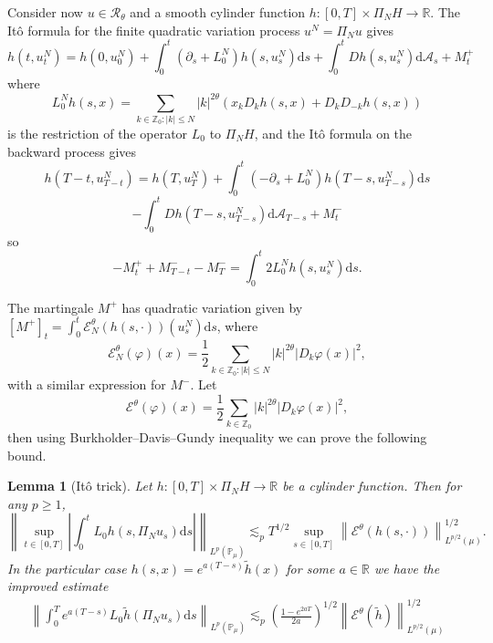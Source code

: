 \documentclass[11pt,a4paper,draft,reqno]{amsart}
\newtheorem{lemma}{Lemma}
\newcommand{\PP}{\mathbb{P}}
\newcommand{\RR}{\mathbb{R}}
\newcommand{\ZZ}{\mathbb{Z}}
\newcommand{\cE}{\mathcal{E}}
\newcommand{\dd}{\mathrm{d}}
\newcommand{\cA}{\mathcal{A}}
\newcommand{\cR}{\mathcal{R}}
\begin{document}
Consider now $u\in\cR_\theta$ and  a smooth cylinder function  $h:[0,T]\times \Pi_N H\to \RR$. The It\^o formula for the finite quadratic variation process $u^N = \Pi_N u$ gives
$$
h(t,u^N_t)=h(0,u^N_0)+\int_0^t (\partial_s + L^N_0) h(s,u^N_s) \dd s +\int_0^t D h(s,u^N_s) \dd \cA_s + M^+_t 
$$ 
where 
$$
L^N_0 h(s,x) = \sum_{k\in\ZZ_0 : |k|\le N} |k|^{2\theta} ( x_{k} D_k h(s,x) + D_k D_{-k} h(s,x))
$$
is the restriction of the operator $L_0$ to $\Pi_N H$,
and the It\^o formula on the backward process gives
$$
h(T-t,u^N_{T-t})=h(T,u^N_T)+ \int_0^{t} (-\partial_s + L^N_0) h(T-s,u^N_{T-s}) \dd s
$$
$$
- \int_0^{t} D h(T-s,u^N_{T-s}) \dd \cA_{T-s} + M^-_t 
$$ 
so
$$
 -M^+_t + M^-_{T-t}-M^-_T = \int_0^t 2 L_0^N   h(s,u^N_{s})\dd s. 
$$


The martingale $M^+$ has quadratic variation given by
$
[ M^+ ]_t = \int_0^t \cE^\theta_N(h(s,\cdot))(u^N_s) \dd s
$,
where 
$$
\cE_N^\theta(\varphi)(x) = \frac12  \sum_{k\in \ZZ_0: |k|\le N}|k|^{2\theta}  |D_k \varphi(x)|^2 ,
$$
with a similar expression for $M^-$. Let
$$
\cE^\theta(\varphi)(x) = \frac12  \sum_{k\in \ZZ_0}|k|^{2\theta}  |D_k \varphi(x)|^2 ,
$$
then using Burkholder--Davis--Gundy inequality we can prove the following bound.
\begin{lemma}[It\^o trick] 
\label{lemma:ito-trick}
Let $h : [0,T]\times \Pi_N H \to \RR$ be a cylinder function. Then
for any $p \geq 1$,
\begin{equation}
\label{eq:ito-trick}
\left\|\sup_{t\in[0,T]}\left|\int_0^t L_0 h(s,\Pi_N u_s) \dd s\right|\right\|_{L^p(\PP_\mu)} \lesssim_p 
T^{1/2} \sup_{s\in[0,T]}\left\|  \cE^\theta(h(s,\cdot))  \right\|^{1/2}_{L^{p/2}(\mu)} .
\end{equation}
In the particular case $h(s,x)= e^{a(T- s)}\tilde h(x)$ for some $a\in\RR$  we have the improved estimate
\begin{equation}
\label{eq:ito-trick-conv}
\begin{split}
\left\|\int_0^T e^{a(T-s)} L_0 \tilde h(\Pi_N u_s) \dd s\right\|_{L^p(\PP_\mu)} 
\lesssim_p
 \left(\frac{1-e^{2aT}}{2a}\right)^{1/2} 
 \left\| \cE^\theta(\tilde h) \right\|^{1/2}_{L^{p/2}(\mu)}
 \end{split}
\end{equation}
\end{lemma}
\end{document}
